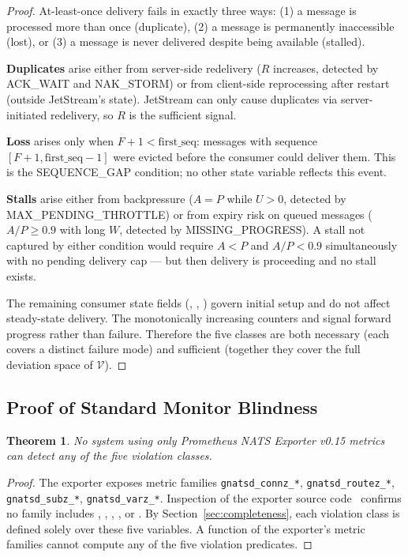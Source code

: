 \documentclass[journal]{IEEEtran}
\newtheorem{theorem}{Theorem}
\begin{document}
\begin{proof}
At-least-once delivery fails in exactly three ways:
(1) a message is processed more than once (duplicate),
(2) a message is permanently inaccessible (lost), or
(3) a message is never delivered despite being available (stalled).

\textbf{Duplicates} arise either from server-side redelivery
($R$ increases, detected by ACK\_WAIT and NAK\_STORM) or from
client-side reprocessing after restart (outside JetStream's state).
JetStream can only cause duplicates via server-initiated redelivery,
so $R$ is the sufficient signal.

\textbf{Loss} arises only when $F{+}1 < \text{first\_seq}$: messages with
sequence $[F{+}1, \text{first\_seq}{-}1]$ were evicted before the consumer
could deliver them. This is the SEQUENCE\_GAP condition; no other state
variable reflects this event.

\textbf{Stalls} arise either from backpressure ($A = P$ while $U{>}0$,
detected by MAX\_PENDING\_THROTTLE) or from expiry risk on queued messages
($A/P \geq 0.9$ with long $W$, detected by MISSING\_PROGRESS).
A stall not captured by either condition would require $A{<}P$ and
$A/P{<}0.9$ simultaneously with no pending delivery cap --- but then
delivery is proceeding and no stall exists.

The remaining consumer state fields (,
, ) govern initial setup and
do not affect steady-state delivery. The monotonically increasing
counters  and  signal
forward progress rather than failure. Therefore the five classes
are both necessary (each covers a distinct failure mode) and sufficient
(together they cover the full deviation space of $\mathcal{V}$).
\end{proof}

\subsection{Proof of Standard Monitor Blindness}
\label{sec:blindness}

\begin{theorem}
\label{thm:blindness}
No system using only Prometheus NATS Exporter v0.15 metrics can detect
any of the five violation classes.
\end{theorem}

\begin{proof}
The exporter exposes metric families \texttt{gnatsd\_connz\_*},
\texttt{gnatsd\_routez\_*}, \texttt{gnatsd\_subz\_*},
\texttt{gnatsd\_varz\_*}. Inspection of the exporter source
code~\cite{prometheus-nats} confirms no family includes
, , ,
, or .
By Section~\ref{sec:completeness}, each violation class is defined
solely over these five variables. A function of the exporter's metric
families cannot compute any of the five violation predicates.
\end{proof}
\end{document}
